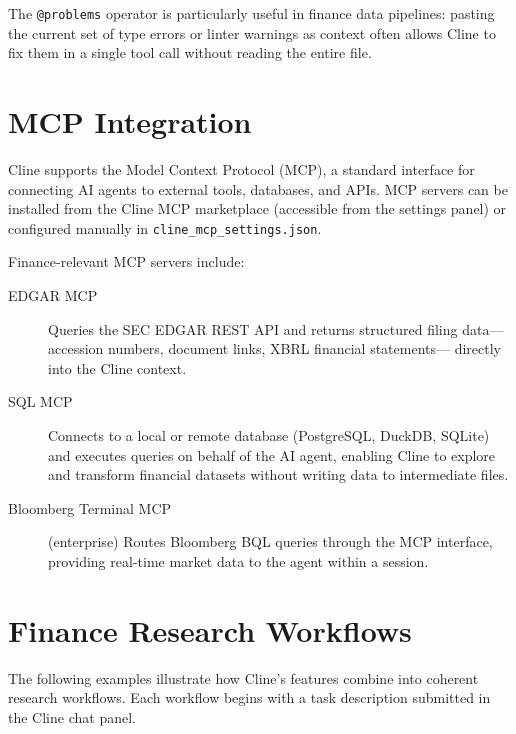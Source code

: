 The \texttt{@problems} operator is particularly useful in finance data pipelines:
pasting the current set of type errors or linter warnings as context often
allows Cline to fix them in a single tool call without reading the entire file.

\section{MCP Integration}
\label{app:cline:mcp}

Cline supports the Model Context Protocol (MCP), a standard interface for
connecting AI agents to external tools, databases, and APIs.  MCP servers
can be installed from the Cline MCP marketplace (accessible from the settings
panel) or configured manually in \texttt{cline\_mcp\_settings.json}.

Finance-relevant MCP servers include:

\begin{description}
  \item[EDGAR MCP] Queries the SEC EDGAR REST API and returns structured filing
        data---accession numbers, document links, XBRL financial statements---
        directly into the Cline context.

  \item[SQL MCP] Connects to a local or remote database (PostgreSQL, DuckDB,
        SQLite) and executes queries on behalf of the AI agent, enabling
        Cline to explore and transform financial datasets without writing
        data to intermediate files.

  \item[Bloomberg Terminal MCP] (enterprise) Routes Bloomberg BQL queries
        through the MCP interface, providing real-time market data to the
        agent within a session.
\end{description}

\section{Finance Research Workflows}
\label{app:cline:finance}

\begin{context}
The following examples illustrate how Cline's features combine into coherent
research workflows.  Each workflow begins with a task description submitted
in the Cline chat panel.
\end{context}

